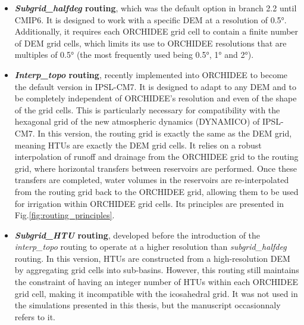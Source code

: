 \begin{itemize}
\item \textbf{\textit{Subgrid\_halfdeg} routing}, which was the default option in branch 2.2 until CMIP6. It is designed to work with a specific DEM at a resolution of 0.5°. Additionally, it requires each ORCHIDEE grid cell to contain a finite number of DEM grid cells, which limits its use to ORCHIDEE resolutions that are multiples of 0.5° (the most frequently used being 0.5°, 1° and 2°).

\item \textbf{\textit{Interp\_topo} routing}, recently implemented into ORCHIDEE to become the default version in IPSL-CM7. It is designed to adapt to any DEM and to be completely independent of ORCHIDEE’s resolution and even of the shape of the grid cells. This is particularly necessary for compatibility with the hexagonal grid of the new atmospheric dynamics (DYNAMICO) of IPSL-CM7.
In this version, the routing grid is exactly the same as the DEM grid, meaning HTUs are exactly the DEM grid cells. It relies on a robust interpolation of runoff and drainage from the ORCHIDEE grid to the routing grid, where horizontal transfers between reservoirs are performed. Once these transfers are completed, water volumes in the reservoirs are re-interpolated from the routing grid back to the ORCHIDEE grid, allowing them to be used for irrigation within ORCHIDEE grid cells. Its principles are presented in Fig.\ref{fig:routing_principles}.

\item \textbf{\textit{Subgrid\_HTU} routing}, developed before the introduction of the \textit{interp\_topo} routing to operate at a higher resolution than \textit{subgrid\_halfdeg} routing. In this version, HTUs are constructed from a high-resolution DEM by aggregating grid cells into sub-basins. However, this routing still maintains the constraint of having an integer number of HTUs within each ORCHIDEE grid cell, making it incompatible with the icosahedral grid. It was not used in the simulations presented in this thesis, but the manuscript occasionnaly refers to it.
\end{itemize}

